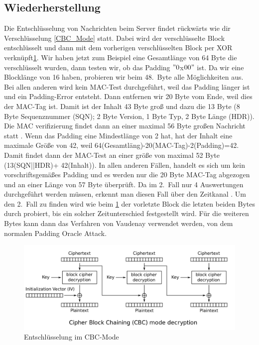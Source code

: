 \documentclass[a4paper,10pt]{scrartcl}
\begin{document}
    \subsection{Wiederherstellung}\label{subsec:wiederherstellung}
    Die Entschlüsselung von Nachrichten beim Server findet rückwärts wie dir Verschlüsselung \ref{CBC_Mode} statt.
    Dabei wird der verschlüsselte Block entschlüsselt und dann mit dem vorherigen verschlüsselten Block per XOR verknüpft\ref{CBC_Mode_brechen}.
    \newline
    Wir haben jetzt zum Beispiel eine Gesamtlänge von 64 Byte die verschlüsselt wurden, dann testen wir, ob das Padding \("0\)x\(00"\) ist.
    Da wir eine Blocklänge von 16 haben, probieren wir beim 48.\ Byte alle Möglichkeiten aus.
    Bei allen anderen wird kein MAC-Test durchgeführt, weil das Padding länger ist und ein Padding-Error entsteht.
    Dann entfernen wir 20 Byte vom Ende, weil dies der MAC-Tag ist.
    Damit ist der Inhalt 43 Byte groß und dazu die 13 Byte (8 Byte Sequenznummer (SQN); 2 Byte Version, 1 Byte Typ, 2 Byte Länge (HDR)).
    Die MAC verifizierung findet dann an einer maximal 56 Byte großen Nachricht statt \cite[S.7]{AlFardan2013}.
    \newline
    Wenn das Padding eine Mindestlänge von 2 hat, hat der Inhalt eine maximale Größe von 42, weil 64(Gesamtläng)-20(MAC-Tag)-2(Padding)=42.
    Damit findet dann der MAC-Test an einer größe von maximal 52 Byte (13(SQN||HDR)+ 42(Inhalt))\cite[S.7]{AlFardan2013}.
    \newline
    In allen anderen Fällen, handelt es sich um kein vorschriftsgemäßes Padding und es werden nur die 20 Byte MAC-Tag abgezogen und an einer Länge von 57 Byte überprüft\cite[s.7]{AlFardan2013}.
    Da im 2.\ Fall nur 4 Auswertungen durchgeführt werden müssen, erkennt man diesen Fall über den Zeitkanal \cite[s.7]{AlFardan2013}.
    Um den 2.\ Fall zu finden wird wie beim \ref{CBC_Mode_brechen} der vorletzte Block die letzten beiden Bytes durch probiert, bis ein solcher Zeitunterschied festgestellt wird.
    Für die weiteren Bytes kann dann das Verfahren von Vaudenay verwendet werden, von dem normalen Padding Oracle Attack\cite[]{Vaudrenite}.

    \begin{figure}[h]
        \begin{center}
            \includegraphics[width=12cm]{./Literatur/documents/CBC_decryption}\newline\caption{Entschlüsselung im CBC-Mode}
            \label{CBC_Mode_brechen}
        \end{center}
    \end{figure}
\end{document}
